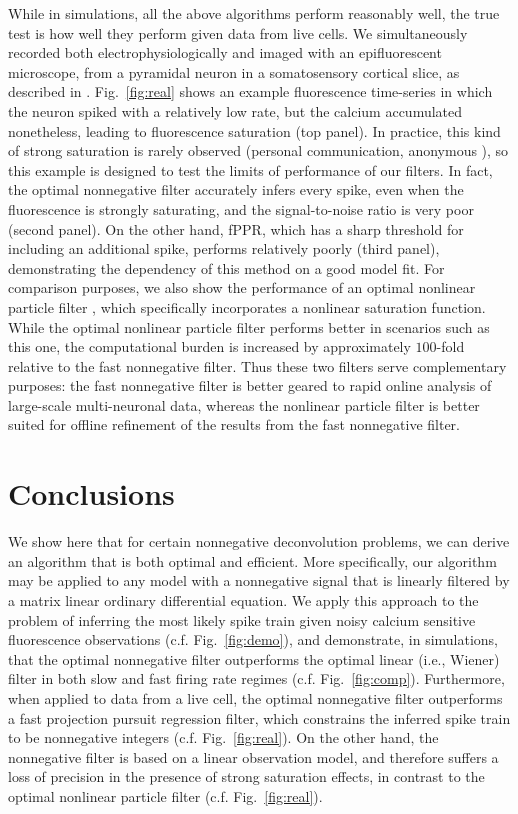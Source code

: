 While in simulations, all the above algorithms perform reasonably well, the true test is how well they perform given data from live cells. We simultaneously recorded both electrophysiologically and imaged with an epifluorescent microscope, from a pyramidal neuron in a somatosensory cortical slice, as described in \cite{MacLeanYuste05}. Fig.\ \ref{fig:real} shows an example fluorescence time-series in which the neuron spiked with a relatively low rate, but the calcium accumulated nonetheless, leading to fluorescence saturation (top panel). In practice, this kind of strong saturation is rarely observed (personal communication, anonymous%
), so this example is designed to test the limits of performance of our filters. %
In fact, the optimal nonnegative filter accurately infers every spike, even when the fluorescence is strongly saturating, and the signal-to-noise ratio is very poor (second panel). On the other hand, fPPR, which has a sharp threshold for including an additional spike, performs relatively poorly (third panel), demonstrating the dependency of this method on a good model fit.  For comparison purposes, we also show the performance of an optimal nonlinear particle filter \cite{BJ08}, which specifically incorporates a nonlinear saturation function. While the optimal nonlinear particle filter performs better in scenarios such as this one, the computational burden is increased by approximately $100$-fold relative to the fast nonnegative filter. Thus these two filters serve complementary purposes: the fast nonnegative filter is better geared to rapid online analysis of large-scale multi-neuronal data, whereas the nonlinear particle filter is better suited for offline refinement of the results from the fast nonnegative filter.   

\section{Conclusions} \label{sec:dis}

We show here that for certain nonnegative deconvolution problems, we can derive an algorithm that is both optimal and efficient.  More specifically, our algorithm may be applied to any model with a nonnegative signal that is linearly filtered by a matrix linear ordinary differential equation.  We apply this approach to the problem of inferring the most likely spike train given noisy calcium sensitive fluorescence observations (c.f. Fig.\ \ref{fig:demo}), and demonstrate, in simulations, that the optimal nonnegative filter outperforms the optimal linear (i.e., Wiener) filter in both slow and fast firing rate regimes (c.f. Fig.\ \ref{fig:comp}).  Furthermore, when applied to data from a live cell, the optimal nonnegative filter outperforms a fast projection pursuit regression filter, which constrains the inferred spike train to be nonnegative integers (c.f. Fig.\ \ref{fig:real}). On the other hand, the nonnegative filter is based on a linear observation model, and therefore suffers a loss of precision in the presence of strong saturation effects, in contrast to the optimal nonlinear particle filter (c.f. Fig.\ \ref{fig:real}).    

